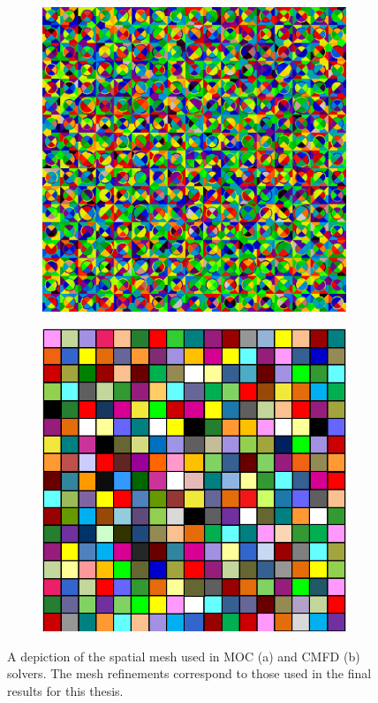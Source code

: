 \begin{figure}[h!]
	\centering
	\begin{subfigure}{0.45\textwidth}
		\centering
		\includegraphics[width=\linewidth]{figures/moc_mesh.PNG}
		\caption{}
		\label{fig:cmfd-mesh-a}
	\end{subfigure}
	\begin{subfigure}{0.45\textwidth}
		\centering
		\includegraphics[width=\linewidth]{figures/cmfd_mesh.PNG}
		\caption{}
		\label{fig:cmfd-mesh-b}
	\end{subfigure}
	\caption[]{A depiction of the spatial mesh used in MOC (a) and CMFD (b) solvers. The mesh refinements correspond to those used in the final results for this thesis.}
	\label{fig:cmfd-mesh}
\end{figure}

